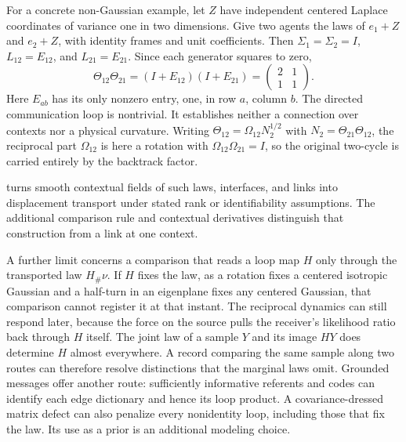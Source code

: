 For a concrete non-Gaussian example, let $Z$ have independent centered Laplace coordinates of variance one in two dimensions. Give two agents the laws of $e_1+Z$ and $e_2+Z$, with identity frames and unit coefficients. Then $\Sigma_1=\Sigma_2=I$, $L_{12}=E_{12}$, and $L_{21}=E_{21}$. Since each generator squares to zero,
\begin{equation}
\Theta_{12}\Theta_{21}
=(I+E_{12})(I+E_{21})
=\begin{pmatrix}2&1\\1&1\end{pmatrix}.
\end{equation}
Here $E_{ab}$ has its only nonzero entry, one, in row $a$, column $b$. The directed communication loop is nontrivial. It establishes neither a connection over contexts nor a physical curvature. Writing $\Theta_{12}=\Omega_{12}N_2^{1/2}$ with $N_2=\Theta_{21}\Theta_{12}$, the reciprocal part $\Omega_{12}$ is here a rotation with $\Omega_{12}\Omega_{21}=I$, so the original two-cycle is carried entirely by the backtrack factor.

 turns smooth contextual fields of such laws, interfaces, and links into displacement transport under stated rank or identifiability assumptions. The additional comparison rule and contextual derivatives distinguish that construction from a link at one context.

A further limit concerns a comparison that reads a loop map $H$ only through the transported law $H_\#\nu$. If $H$ fixes the law, as a rotation fixes a centered isotropic Gaussian and a half-turn in an eigenplane fixes any centered Gaussian, that comparison cannot register it at that instant. The reciprocal dynamics can still respond later, because the force on the source pulls the receiver's likelihood ratio back through $H$ itself. The joint law of a sample $Y$ and its image $HY$ does determine $H$ almost everywhere. A record comparing the same sample along two routes can therefore resolve distinctions that the marginal laws omit. Grounded messages offer another route: sufficiently informative referents and codes can identify each edge dictionary and hence its loop product. A covariance-dressed matrix defect can also penalize every nonidentity loop, including those that fix the law. Its use as a prior is an additional modeling choice.
